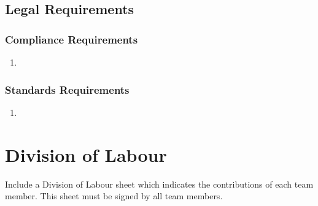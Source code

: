\documentclass[]{article}
\begin{document}

\subsection{Legal Requirements}
\label{sub:legal_requirements}

\subsubsection{Compliance Requirements}
\label{ssub:compliance_requirements}
\begin{enumerate}[{LR-COMP}1. ]
	\item 
\end{enumerate}

\subsubsection{Standards Requirements}
\label{ssub:standards_requirements}
\begin{enumerate}[{LR-STD}1. ]
	\item 
\end{enumerate}



\appendix
\section{Division of Labour}
\label{sec:division_of_labour}
Include a Division of Labour sheet which indicates the contributions of each team member. This sheet must be signed by all team members.

\end{document}
